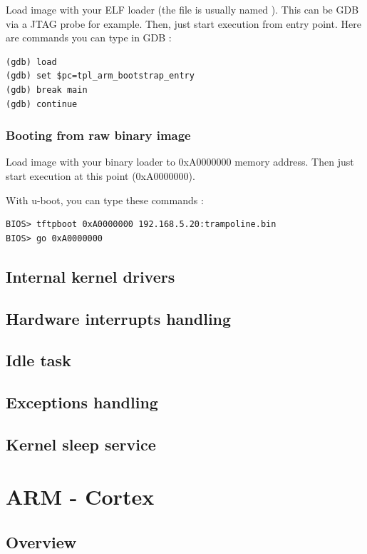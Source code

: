 Load image with your ELF loader (the file is usually named ). This can be GDB via a JTAG probe for example. Then, just start execution from  entry point. Here are commands you can type in GDB :
\begin{lstlisting}
(gdb) load
(gdb) set $pc=tpl_arm_bootstrap_entry
(gdb) break main
(gdb) continue
\end{lstlisting}

\subsubsection{Booting from raw binary image}

Load image with your binary loader to 0xA0000000 memory address. Then just start execution at this point (0xA0000000).

With u-boot, you can type these commands :
\begin{lstlisting}
BIOS> tftpboot 0xA0000000 192.168.5.20:trampoline.bin
BIOS> go 0xA0000000
\end{lstlisting}

\subsection{Internal kernel drivers}

\subsection{Hardware interrupts handling}

\subsection{Idle task}

\subsection{Exceptions handling}

\subsection{Kernel sleep service}


\section{ARM - Cortex}

\subsection{Overview}

